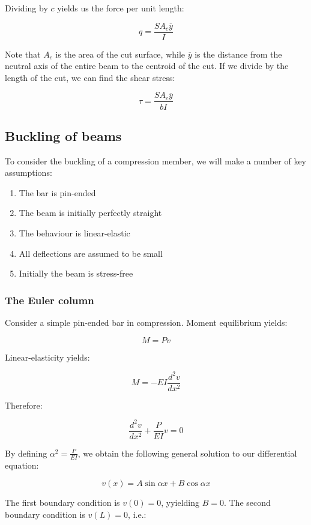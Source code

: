 \documentclass{article}
\begin{document}
Dividing by $c$ yields us the force per unit length:

\[ q = \frac{SA_c\overline{y}}{I} \]

Note that $A_c$ is the area of the cut surface, while $\overline{y}$ is the distance from the neutral axis of the entire beam to the centroid of the cut. If we divide by the length of the cut, we can find the shear stress:

\[ \tau = \frac{SA_c\overline{y}}{bI} \]

\newpage

\subsection{Buckling of beams}

\begin{proposition}[Hypotheses]
    To consider the buckling of a compression member, we will make a number of key assumptions:
    \begin{enumerate}
        \item The bar is pin-ended
        \item The beam is initially perfectly straight
        \item The behaviour is linear-elastic
        \item All deflections are assumed to be small
        \item Initially the beam is stress-free
    \end{enumerate}
\end{proposition}

\subsubsection{The Euler column}

Consider a simple pin-ended bar in compression. Moment equilibrium yields:

\[ M = Pv \]

Linear-elasticity yields:

\[ M = -EI\frac{d^2v}{dx^2} \]

Therefore:

\[ \frac{d^2v}{dx^2} + \frac{P}{EI}v = 0 \]

By defining $\alpha^2 = \frac{P}{EI}$, we obtain the following general solution to our differential equation:

\[ v(x) = A\sin{\alpha x} + B\cos{\alpha x} \]

The first boundary condition is $v(0) = 0$, yyielding $B = 0$. The second boundary condition is $v(L) = 0$, i.e.:
\end{document}
